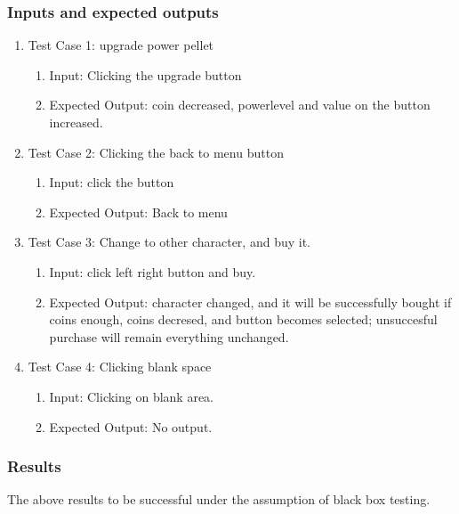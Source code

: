 \documentclass[11pt]{article}
\begin{document}
    \subsubsection*{Inputs and expected outputs}
    \begin{enumerate}
        \item Test Case 1: upgrade power pellet
        \begin{enumerate}
            \item Input: Clicking the upgrade button
            \item Expected Output: coin decreased, powerlevel and value on the button increased.
        \end{enumerate}
        
        \item Test Case 2: Clicking the back to menu button
        \begin{enumerate}
            \item Input: click the button
            \item Expected Output: Back to menu
        \end{enumerate}
        
        \item Test Case 3: Change to other character, and buy it.
        \begin{enumerate}
            \item Input: click left right button and buy.
            \item Expected Output: character changed, and it will be successfully bought if coins enough, coins decresed, and button becomes selected; unsuccesful purchase will remain everything unchanged.
        \end{enumerate}
        
        \item Test Case 4: Clicking blank space
        \begin{enumerate}
            \item Input: Clicking on blank area.
            \item Expected Output: No output.
        \end{enumerate}
    \end{enumerate}

    \subsubsection*{Results}

    The above results to be successful under the assumption of black box testing.
\end{document}
